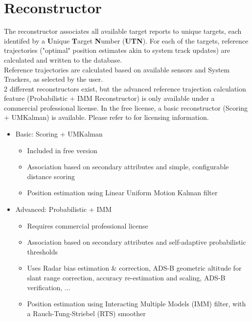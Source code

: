 \chapter{Reconstructor}
\label{sec:reconst} 

The reconstructor associates all available target reports to unique targets, each identifed by a \textbf{U}nique \textbf{T}arget \textbf{N}umber (\textbf{UTN}). For each of the targets, reference trajectories ("optimal" position estimates akin to system track updates) are calculated and written to the database. \\

Reference trajectories are calculated based on available sensors and System Trackers, as selected by the user. \\

2 different reconstructors exist, but the advanced reference trajection calculation feature (Probabilistic + IMM Reconstructor) is only available under a commercial professional license. In the free license, a basic reconstructor (Scoring + UMKalman) is available. Please refer to  for licensing information. \\

\begin{itemize}  
   \item Basic: Scoring + UMKalman
   \begin{itemize}  
   \item Included in free version
   \item Association based on secondary attributes and simple, configurable distance scoring
   \item Position estimation using Linear Uniform Motion Kalman filter
   \end{itemize}  
   \item Advanced: Probabilistic + IMM
   \begin{itemize}  
   \item Requires commercial professional license
   \item Association based on secondary attributes and self-adaptive probabilistic thresholds
   \item Uses Radar bias estimation \& correction, ADS-B geometric altitude for slant range correction, accuracy re-estimation and scaling, ADS-B verification, ...
   \item Position estimation using Interacting Multiple Models (IMM) filter, with a Rauch-Tung-Striebel (RTS) smoother
   \end{itemize}
\end{itemize}  

